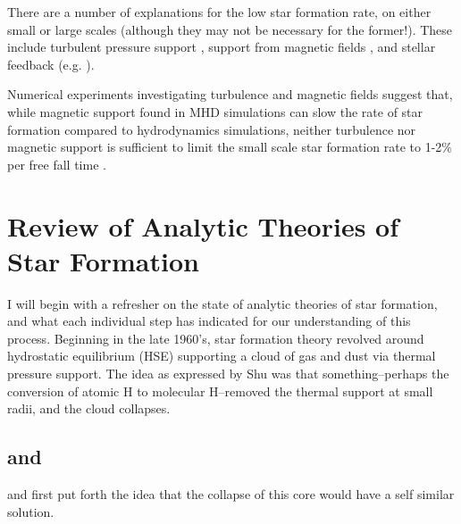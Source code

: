 \documentclass[../dissertation.tex]{subfiles}
\begin{document}
There are a number of explanations for the low star formation rate, on 
either small or large scales (although they may not be necessary for the former!). 
These include turbulent pressure support \citep{1992ApJ...396..631M}, support from magnetic fields
\citep{1966MNRAS.132..359S,1976ApJ...207..141M}, and stellar feedback (e.g.
\citealt{1986ApJ...303...39D}).  


Numerical experiments investigating turbulence and magnetic fields suggest that, while magnetic support found in MHD simulations can slow the rate of star formation 
compared to hydrodynamics simulations, neither turbulence nor magnetic support is sufficient to limit the small scale star formation rate to 1-2\% per free fall time
\citep{2010ApJ...709...27W,2011MNRAS.410L...8C,2011ApJ...730...40P,2012ApJ...754...71K,2014MNRAS.439.3420M,2015ApJ...808...48B,2017ApJ...838...40M}.

\section{Review of Analytic Theories of Star Formation} \label{sec:sf_review}
I will begin with a refresher on the state of analytic theories of star formation, and what each individual step has indicated for our understanding of this process.
Beginning in the late 1960's, star formation theory revolved around hydrostatic equilibrium (HSE) supporting a cloud of gas and dust via thermal pressure support. 
The idea as expressed by Shu was that something--perhaps the conversion of atomic H to molecular H--removed the thermal support at small radii, and the cloud collapses.

\subsection{\citet{1969MNRAS.145..271L} and \citet{1969MNRAS.144..425P}}
\citet{1969MNRAS.145..271L} and \citet{1969MNRAS.144..425P} first put forth the idea that the collapse of this core would have a self similar solution. 
\end{document}
